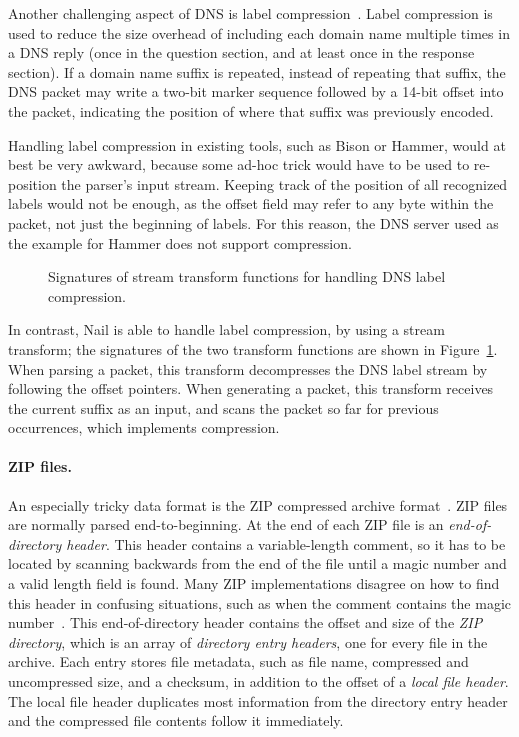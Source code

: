 Another challenging aspect of DNS is label
compression~\cite[\S4.1.4]{RFC:1035}.  Label compression is used to reduce
the size overhead of including each domain name multiple times in a DNS
reply (once in the question section, and at least once in the response
section).  If a domain name suffix is repeated, instead of repeating that
suffix, the DNS packet may write a two-bit marker sequence followed by
a 14-bit offset into the packet, indicating the position of where that
suffix was previously encoded.



Handling label compression in existing tools, such as Bison or Hammer,
would at best be very awkward, because some ad-hoc trick would have to
be used to re-position the parser's input stream.  Keeping track of the
position of all recognized labels would not be enough, as the offset field
may refer to any byte within the packet, not just the beginning of labels.
For this reason, the DNS server used as the example for Hammer does not
support compression.

\begin{figure}
\smaller[0.5]

\caption{Signatures of stream transform functions for handling DNS label compression.}
\label{fig:dns-xform}
\end{figure}

In contrast, Nail is able to handle label compression, by using a stream
transform; the signatures of the two transform functions are shown
in Figure~\ref{fig:dns-xform}.  When parsing a packet, this transform
decompresses the DNS label stream by following the offset pointers.
When generating a packet, this transform receives the current suffix as
an input, and scans the packet so far for previous occurrences, which
implements compression.


\paragraph{ZIP files.}

An especially tricky data format is the ZIP compressed archive
format~\cite{pkzip}.  ZIP files are normally parsed end-to-beginning. At
the end of each ZIP file is an \emph{end-of-directory header}. This header
contains a variable-length comment, so it has to be located by scanning
backwards from the end of the file until a magic number and a valid
length field is found. Many ZIP implementations disagree on how to find
this header in confusing situations, such as when the comment contains
the magic number~\cite{wolf:berlinsides-zip}.  This end-of-directory
header contains the offset and size of the \emph{ZIP directory}, which
is an array of \emph{directory entry headers}, one for every file
in the archive.  Each entry stores file metadata, such as file name,
compressed and uncompressed size, and a checksum, in addition to the
offset of a \emph{local file header}. The local file header duplicates
most information from the directory entry header and the compressed file
contents follow it immediately.

